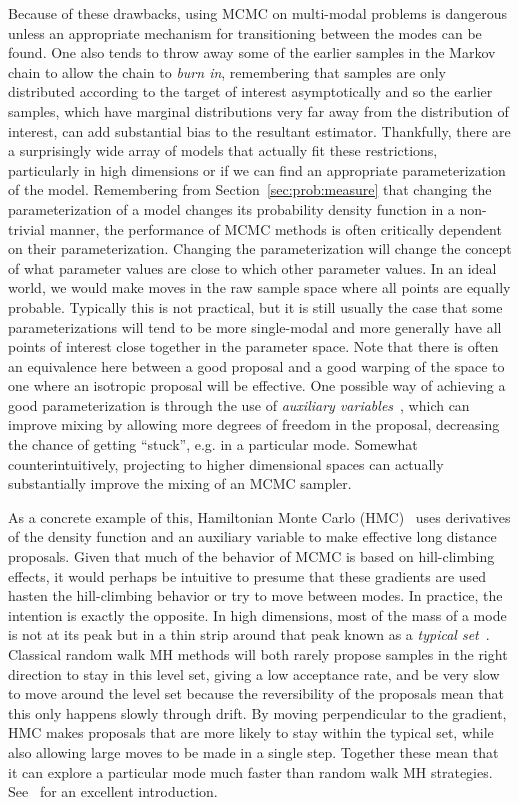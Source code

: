 Because of these drawbacks, using MCMC on multi-modal problems is dangerous unless an appropriate mechanism
for transitioning between the modes can be found.  One also tends to throw away some of the earlier samples
in the Markov chain to allow the chain to \emph{burn in}, remembering that samples are only distributed according
to the target of interest asymptotically and so the earlier samples, which have marginal distributions very far away
from the distribution of interest, can add substantial bias to the resultant estimator.
Thankfully, there are a surprisingly wide array of models that actually 
fit these restrictions, particularly in high dimensions or if we can find an appropriate parameterization of the model.  
Remembering from Section~\ref{sec:prob:measure} that changing the parameterization of a model changes its probability
density function in a non-trivial manner, the performance of MCMC methods is often critically dependent on
their parameterization.  Changing the parameterization will change
the concept of what parameter values are close to which other parameter values.  In an ideal world, we
would make moves in the raw sample space where all points are equally probable.  
Typically this is not practical, but it is still usually the
case that some parameterizations will tend to be more single-modal and more generally have all points of
interest close together in the parameter space.  Note that there is often an equivalence here between a good proposal
and a good warping of the space to one where an isotropic proposal will be effective.  One possible way of
achieving a good parameterization is through the use of  
\emph{auxiliary variables}~\citep{higdon1998auxiliary,andrieu2010particle},
which can improve mixing by allowing more degrees of freedom in the proposal, decreasing the chance of getting
``stuck'', e.g. in a particular mode.  Somewhat counterintuitively, projecting
to higher dimensional spaces can actually substantially improve the mixing of an MCMC sampler.

As a concrete example of this, Hamiltonian Monte Carlo (HMC)~\citep{duane1987hybrid,neal2011mcmc} uses derivatives of
the density function and an auxiliary variable to make effective long distance proposals.  Given that
much of the behavior of MCMC is based on hill-climbing effects, it would perhaps be intuitive to presume that
these gradients are used hasten the hill-climbing behavior or try to move between modes.  In practice, the intention 
is exactly the opposite.  In high dimensions, most of the mass of a mode is not at its peak but in a thin strip
around that peak known as a \emph{typical set}~\citep{betancourt2017conceptual}.  Classical random walk MH
methods will both rarely propose samples in the right direction to stay in this level set, giving a low acceptance rate,
and be very slow to move around the level set because the reversibility of the proposals mean that this only 
happens slowly through drift.  By moving perpendicular to the gradient, HMC makes proposals that are more likely to
stay within the typical set, while also allowing large moves to be made in a single step.  Together these mean
that it can explore a particular mode much faster than random walk MH strategies.  See~\cite{betancourt2017conceptual}
for an excellent introduction.

